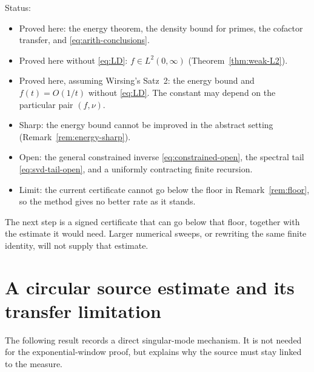 \documentclass[11pt,letterpaper]{article}
\numberwithin{equation}{section}
\theoremstyle{definition}
\theoremstyle{remark}
\begin{document}
Status:
\begin{itemize}
 \item Proved here: the energy theorem, the density bound for primes, the
       cofactor transfer, and \eqref{eq:arith-conclusions}.
 \item Proved here without \eqref{eq:LD}: $f\in L^2(0,\infty)$
       (Theorem~\ref{thm:weak-L2}).
 \item Proved here, assuming Wirsing's Satz~2: the energy bound and
       $f(t)=O(1/t)$ without \eqref{eq:LD}. The constant may depend on
       the particular pair $(f,\nu)$.
 \item Sharp: the energy bound cannot be improved in the abstract setting
       (Remark~\ref{rem:energy-sharp}).
 \item Open: the general constrained inverse \eqref{eq:constrained-open},
       the spectral tail \eqref{eq:svd-tail-open}, and a uniformly
       contracting finite recursion.
 \item Limit: the current certificate cannot go below the floor in
       Remark~\ref{rem:floor}, so the method gives no better rate as it
       stands.
\end{itemize}
The next step is a signed certificate that can go below that floor,
together with the estimate it would need. Larger numerical sweeps, or
rewriting the same finite identity, will not supply that estimate.

\appendix
\section{A circular source estimate and its transfer limitation}
\label{app:circle}

The following result records a direct singular-mode mechanism.
It is not needed for the exponential-window proof, but explains why the
source must stay linked to the measure.
\end{document}
